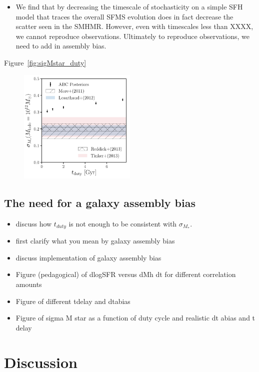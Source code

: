 \documentclass[12pt, letterpaper, preprint]{aastex}
\newcommand{\bitem}{\begin{itemize}}
\newcommand{\eitem}{\end{itemize}}
\begin{document}
\bitem
\item We find that by decreasing the timescale of stochasticity on a simple SFH model that traces the overall 
SFMS evolution does in fact decrease the scatter seen in the SMHMR. However, even with timescales less
than XXXX, we cannot reproduce observations. Ultimately to reproduce observations, we need to add in 
assembly bias. 

\eitem

Figure~\ref{fig:sigMstar_duty} 

\begin{figure}
\begin{center}
\includegraphics[width=0.5\textwidth]{figs/sigMstar_tduty.pdf}
\caption{}
\label{fig:abc_demo}
\end{center}
\end{figure}

\subsection{The need for a galaxy assembly bias}
\bitem
\item discuss how $t_{duty}$ is not enough to be consistent with $\sigma_{M_*}$. 
\item first clarify what you mean by galaxy assembly bias 
\item discuss implementation of galaxy assembly bias
\item Figure (pedagogical) of dlogSFR versus dMh dt for different correlation amounts 
\item Figure of different tdelay and dtabias 
\item Figure of sigma M star as a function of duty cycle and realistic dt abias and t delay 
\eitem

\section{Discussion} \label{sec:discussion}
\end{document}
